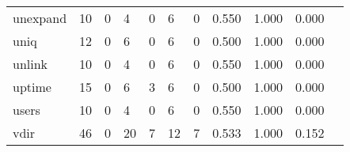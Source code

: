 \begin{longtable}{lp{1.2cm}p{1.2cm}p{1.2cm}p{1.2cm}p{1.2cm}p{1.2cm}p{1.2cm}p{1.2cm}p{1.2cm}p{1.2cm}}
unexpand  &                                    10 &                                                  0 &                                                  4 &                                                  0 &                                                  6 &                                                  0 &                                              0.550 &                                              1.000 &                                              0.000 \\
uniq      &                                    12 &                                                  0 &                                                  6 &                                                  0 &                                                  6 &                                                  0 &                                              0.500 &                                              1.000 &                                              0.000 \\
unlink    &                                    10 &                                                  0 &                                                  4 &                                                  0 &                                                  6 &                                                  0 &                                              0.550 &                                              1.000 &                                              0.000 \\
uptime    &                                    15 &                                                  0 &                                                  6 &                                                  3 &                                                  6 &                                                  0 &                                              0.500 &                                              1.000 &                                              0.000 \\
users     &                                    10 &                                                  0 &                                                  4 &                                                  0 &                                                  6 &                                                  0 &                                              0.550 &                                              1.000 &                                              0.000 \\
vdir      &                                    46 &                                                  0 &                                                 20 &                                                  7 &                                                 12 &                                                  7 &                                              0.533 &                                              1.000 &                                              0.152 \\

\end{longtable}

